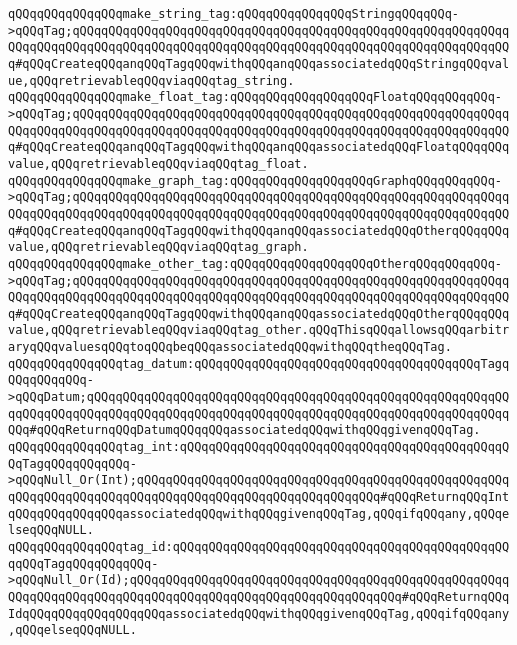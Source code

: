 \verb|qQQqqQQqqQQqqQQqmake_string_tag:qQQqqQQqqQQqqQQqStringqQQqqQQq->qQQqTag;qQQqqQQqqQQqqQQqqQQqqQQqqQQqqQQqqQQqqQQqqQQqqQQqqQQqqQQqqQQqqQQqqQQqqQQqqQQqqQQqqQQqqQQqqQQqqQQqqQQqqQQqqQQqqQQqqQQqqQQqqQQqqQQqqQQq#qQQqCreateqQQqanqQQqTagqQQqwithqQQqanqQQqassociatedqQQqStringqQQqvalue,qQQqretrievableqQQqviaqQQqtag_string.|\newline
\verb|qQQqqQQqqQQqqQQqmake_float_tag:qQQqqQQqqQQqqQQqqQQqFloatqQQqqQQqqQQq->qQQqTag;qQQqqQQqqQQqqQQqqQQqqQQqqQQqqQQqqQQqqQQqqQQqqQQqqQQqqQQqqQQqqQQqqQQqqQQqqQQqqQQqqQQqqQQqqQQqqQQqqQQqqQQqqQQqqQQqqQQqqQQqqQQqqQQqqQQq#qQQqCreateqQQqanqQQqTagqQQqwithqQQqanqQQqassociatedqQQqFloatqQQqqQQqvalue,qQQqretrievableqQQqviaqQQqtag_float.|\newline
\verb|qQQqqQQqqQQqqQQqmake_graph_tag:qQQqqQQqqQQqqQQqqQQqGraphqQQqqQQqqQQq->qQQqTag;qQQqqQQqqQQqqQQqqQQqqQQqqQQqqQQqqQQqqQQqqQQqqQQqqQQqqQQqqQQqqQQqqQQqqQQqqQQqqQQqqQQqqQQqqQQqqQQqqQQqqQQqqQQqqQQqqQQqqQQqqQQqqQQqqQQq#qQQqCreateqQQqanqQQqTagqQQqwithqQQqanqQQqassociatedqQQqOtherqQQqqQQqvalue,qQQqretrievableqQQqviaqQQqtag_graph.|\newline
\verb|qQQqqQQqqQQqqQQqmake_other_tag:qQQqqQQqqQQqqQQqqQQqOtherqQQqqQQqqQQq->qQQqTag;qQQqqQQqqQQqqQQqqQQqqQQqqQQqqQQqqQQqqQQqqQQqqQQqqQQqqQQqqQQqqQQqqQQqqQQqqQQqqQQqqQQqqQQqqQQqqQQqqQQqqQQqqQQqqQQqqQQqqQQqqQQqqQQqqQQq#qQQqCreateqQQqanqQQqTagqQQqwithqQQqanqQQqassociatedqQQqOtherqQQqqQQqvalue,qQQqretrievableqQQqviaqQQqtag_other.qQQqThisqQQqallowsqQQqarbitraryqQQqvaluesqQQqtoqQQqbeqQQqassociatedqQQqwithqQQqtheqQQqTag.|\newline
\newline
\verb|qQQqqQQqqQQqqQQqtag_datum:qQQqqQQqqQQqqQQqqQQqqQQqqQQqqQQqqQQqqQQqTagqQQqqQQqqQQq->qQQqDatum;qQQqqQQqqQQqqQQqqQQqqQQqqQQqqQQqqQQqqQQqqQQqqQQqqQQqqQQqqQQqqQQqqQQqqQQqqQQqqQQqqQQqqQQqqQQqqQQqqQQqqQQqqQQqqQQqqQQqqQQqqQQqqQQqqQQq#qQQqReturnqQQqDatumqQQqqQQqassociatedqQQqwithqQQqgivenqQQqTag.|\newline
\verb|qQQqqQQqqQQqqQQqtag_int:qQQqqQQqqQQqqQQqqQQqqQQqqQQqqQQqqQQqqQQqqQQqqQQqTagqQQqqQQqqQQq->qQQqNull_Or(Int);qQQqqQQqqQQqqQQqqQQqqQQqqQQqqQQqqQQqqQQqqQQqqQQqqQQqqQQqqQQqqQQqqQQqqQQqqQQqqQQqqQQqqQQqqQQqqQQqqQQqqQQq#qQQqReturnqQQqIntqQQqqQQqqQQqqQQqassociatedqQQqwithqQQqgivenqQQqTag,qQQqifqQQqany,qQQqelseqQQqNULL.|\newline
\verb|qQQqqQQqqQQqqQQqtag_id:qQQqqQQqqQQqqQQqqQQqqQQqqQQqqQQqqQQqqQQqqQQqqQQqqQQqTagqQQqqQQqqQQq->qQQqNull_Or(Id);qQQqqQQqqQQqqQQqqQQqqQQqqQQqqQQqqQQqqQQqqQQqqQQqqQQqqQQqqQQqqQQqqQQqqQQqqQQqqQQqqQQqqQQqqQQqqQQqqQQqqQQqqQQq#qQQqReturnqQQqIdqQQqqQQqqQQqqQQqqQQqassociatedqQQqwithqQQqgivenqQQqTag,qQQqifqQQqany,qQQqelseqQQqNULL.|\newline
